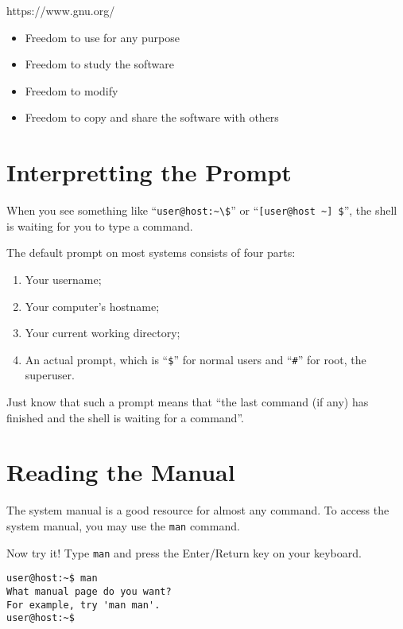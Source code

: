 \documentclass{extbook}
\begin{document}
https://www.gnu.org/

\begin{itemize}
\item Freedom to use for any purpose
\item Freedom to study the software
\item Freedom to modify
\item Freedom to copy and share the software with others
\end{itemize}

\section{Interpretting the Prompt}

When you see something like ``\verb|user@host:~\$|'' or ``\verb|[user@host ~] $|'', the shell is waiting for you to type a command.

The default prompt on most systems consists of four parts:
\begin{enumerate}
	\item Your username;
	\item Your computer's hostname;
	\item Your current working directory;
	\item An actual prompt, which is ``\verb|$|'' for normal users and ``\verb|#|'' for root, the superuser.
\end{enumerate}


Just know that such a prompt means that ``the last command (if any) has finished and the shell is waiting for a command''.

\section{Reading the Manual}

The system manual is a good resource for almost any command.  To access the system manual, you may use the \verb|man| command.

Now try it!  Type \verb|man| and press the Enter/Return key on your keyboard.
\begin{verbatim}
user@host:~$ man
What manual page do you want?
For example, try 'man man'.
user@host:~$ 
\end{verbatim}
\end{document}
